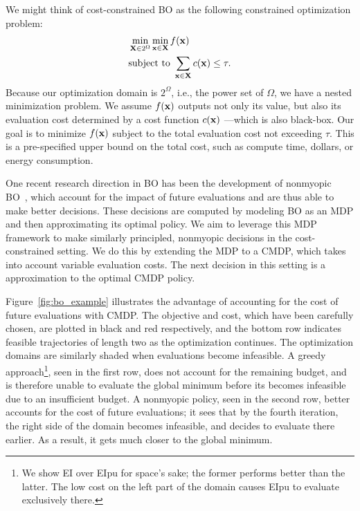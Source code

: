 We might think of cost-constrained BO as the following constrained optimization problem: 
\begin{equation*}
    \begin{split}
    & \min_{\textbf{X} \in 2^\Omega} \min_{{\mathbf{x}} \in \textbf{X}} f({\mathbf{x}}) \\
    & \text{subject to } \sum_{{\mathbf{x}} \in \textbf{X}} c({\mathbf{x}}) \leq \tau. 
    \end{split}
\end{equation*}
Because our optimization domain is $2^\Omega$, i.e., the power set of $\Omega$, we have a nested minimization problem. 
We assume $f({\mathbf{x}})$ outputs not only its value, but also its evaluation cost determined by a cost function $c({\mathbf{x}})$ ---which is also black-box. 
Our goal is to minimize $f({\mathbf{x}})$ subject to the total evaluation cost not exceeding $\tau$. 
This is a pre-specified upper bound on the total cost, such as compute time, dollars, or energy consumption.

One recent research direction in BO has been the development of nonmyopic BO~\citep{lam2016bayesian, lam2017lookahead, yue2019lookahead, frazier2018, lee2020efficient, jiang2020efficient}, which account for the impact of future evaluations and are thus able to make better decisions. 
These decisions are computed by modeling BO as an MDP and then approximating its optimal policy. 
We aim to leverage this MDP framework to make similarly principled, nonmyopic decisions in the cost-constrained setting. 
We do this by extending the MDP to a CMDP, which takes into account variable evaluation costs. The next decision in this setting is a approximation to the optimal CMDP policy. 

Figure~\ref{fig:bo_example} illustrates the advantage of accounting for the cost of future evaluations with CMDP. 
The objective and cost, which have been carefully chosen, are plotted in black and red respectively, and the bottom row indicates feasible trajectories of length two as the optimization continues. 
The optimization domains are similarly shaded when evaluations become infeasible. 
A greedy approach\footnote{We show EI over EIpu for space's sake; the former performs better than the latter. The low cost on the left part of the domain causes EIpu to evaluate exclusively there.}, seen in the first row, does not account for the remaining budget, and is therefore unable to evaluate the global minimum before its becomes infeasible due to an insufficient budget. 
A nonmyopic policy, seen in the second row, better accounts for the cost of future evaluations; it sees that by the fourth iteration, the right side of the domain becomes infeasible, and decides to evaluate there earlier. As a result, it gets much closer to the global minimum. 

